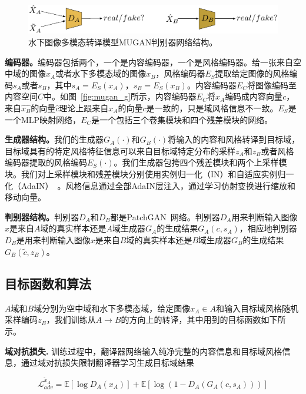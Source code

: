 \begin{figure}[ht]
    \centering
    \includegraphics[width=1\textwidth]{figures/D.pdf}
    \caption{水下图像多模态转译模型MUGAN判别器网络结构。}
    \label{fig:mugan_d}
\end{figure}

\textbf{编码器。}编码器包括两个，一个是内容编码器，一个是风格编码器。给一张来自空中域的图像$x_A$或者水下多模态域的图像$x_B$，风格编码器$E_S$提取给定图像的风格编码$s_A$或者$s_B$，其中$s_A = E_S(x_A)$，$s_B = E_S(x_B)$。内容编码器$E_C$将图像编码至内容空间$C$中。如图~\ref{fig:mugan_g}所示，内容编码器$E_C$将$x_A$编码成内容向量$c$，来自$\hat{x_B}$的向量$\hat{c}$理论上跟来自$x_A$的向量$c$是一致的，只是域风格信息不一致。$E_S$是一个MLP映射网络，$E_C$是一个包括三个卷集模块和四个残差模块的网络。

\textbf{生成器结构。}我们的生成器$G_A(\cdot)$和$G_B(\cdot)$将输入的内容和风格转译到目标域，目标域具有的特定风格特征信息可以来自目标域特定分布的采样$z_A$和$z_B$或者风格编码器提取的风格编码$E_S(\cdot)$。我们生成器包挎四个残差模块和两个上采样模块。我们对上采样模块和残差模块分别使用实例归一化（IN）和自适应实例归一化（AdaIN）~\cite{huang2017arbitrary}。风格信息通过全部AdaIN层注入，通过学习仿射变换进行缩放和移动向量。

\textbf{判别器结构。}判别器$D_A$和$D_B$都是PatchGAN~\cite{isola2017image}网络。判别器$D_A$用来判断输入图像$x$是来自$A$域的真实样本还是$A$域生成器$G_A$的生成结果$G_A(c,s_A)$，相应地判别器$D_B$是用来判断输入图像$x$是来自$B$域的真实样本还是$B$域生成器$G_B$的生成结果$G_B(\tilde{c},z_B)$。

\subsection{目标函数和算法}
$A$域和$B$域分别为空中域和水下多模态域，给定图像$x_A \in A$和输入目标域风格随机采样编码$z_B$，我们训练从$A \rightarrow B$的方向上的转译，其中用到的目标函数如下所示。

\textbf{域对抗损失.} 训练过程中，翻译器网络输入纯净完整的内容信息和目标域风格信息，通过域对抗损失限制翻译器学习生成目标域结果

\begin{equation}
\label{equ:adv_a_}
\mathcal{L}_{adv}^{\tilde{x}_A} = \mathbb{E}[\log D_A(x_A)] + \mathbb{E}[\log(1-D_A(G_A(c,s_A)))]
\end{equation}

